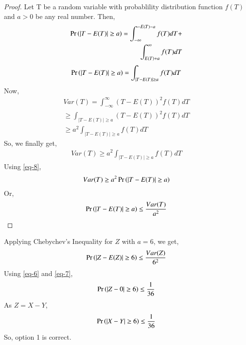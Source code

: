 \documentclass[journal,12pt,twocolumn]{IEEEtran}
\begin{document}
\begin{proof}
Let T be a random variable with probablility distribution function $f(T)$ and $a>0$ be any real number.
Then,
\begin{align}
    \Pr\left(|T-E(T)| \geq a\right)= \int_{-\infty}^{-E(T)-a}f(T)dT + \nonumber \\  \int_{E(T)+a}^{\infty}f(T)dT
\end{align}
\begin{align} \label{eq-8}
    \Pr\left(|T-E(T)| \geq a\right)= \int_{|T-E(T)| \geq a}f(T)dT
\end{align}
Now,
\begin{align}
    Var(T)= \int_{-\infty}^{\infty}(T-E(T))^2f(T)dT \nonumber \\ \geq \int_{|T-E(T)|\geq a}(T-E(T))^2f(T)dT \nonumber \\ \geq a^2\int_{|T-E(T)|\geq a}f(T)dT
\end{align}
So, we finally get,
\begin{align}
    Var(T) \geq a^2\int_{|T-E(T)|\geq a}f(T)dT
\end{align}
Using \eqref{eq-8},
\begin{align}
    Var(T) \geq a^2\Pr\left(|T-E(T)| \geq a\right)
\end{align}
Or,
\begin{align}
    \Pr\left(|T-E(T)| \geq a\right) \leq \dfrac{Var(T)}{a^2}
\end{align}
\end{proof}
Applying Chebychev's Inequality for $Z$ with $a=6$, we get,
\begin{align}
    \Pr\left(|Z-E(Z)| \geq 6\right) \leq \dfrac{Var(Z)}{6^2}
\end{align}
Using \eqref{eq-6} and \eqref{eq-7},
\begin{align}
    \Pr\left(|Z-0| \geq 6\right) \leq \dfrac{1}{36}
\end{align}
As $Z=X-Y$,
\begin{align}
    \Pr\left(|X-Y| \geq 6\right) \leq \dfrac{1}{36}
\end{align}
So, option 1 is correct.
\end{document}
